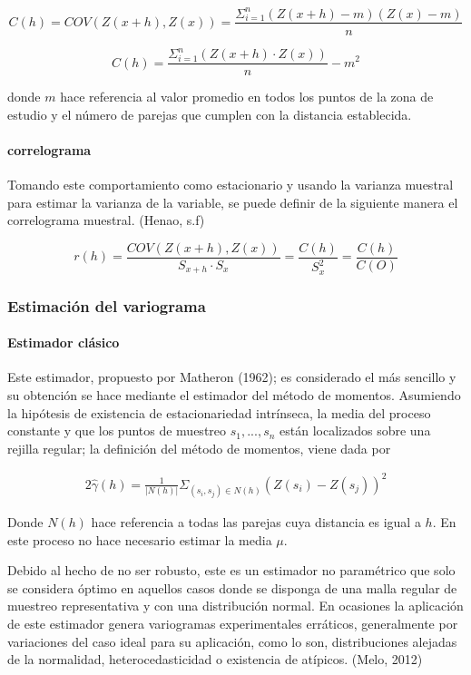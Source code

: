 $$C(h)= COV (Z(x+h), Z(x)) = \frac{\Sigma_{i=1}^n (Z(x+h)-m)(Z(x)-m)}{n} $$

$$ C(h) = \frac{\Sigma_{i=1}^n (Z(x+h) \cdot Z(x))}{n} - m^2$$

 donde $m$ hace referencia al valor promedio en todos los puntos de la zona de estudio y el número de parejas que cumplen con la distancia establecida.
 
 \paragraph{correlograma}
 Tomando este comportamiento como estacionario y usando la varianza muestral para estimar la varianza de la variable, se puede definir de la siguiente
manera el correlograma muestral. (Henao, s.f) \cite{henao_2015}

$$ r(h) = \frac{COV (Z(x+h) , Z(x))}{S_{x+h} \cdot S_x} = \frac{C(h)}{S_x^2} = \frac{C(h)}{C(O)}$$


\subsubsection{Estimación del variograma}

\paragraph{Estimador clásico}
Este estimador, propuesto por Matheron (1962); es considerado el más sencillo y su obtención se hace
mediante el estimador del método de momentos. Asumiendo la hipótesis de existencia de
estacionariedad intrínseca, la media del proceso constante y que los puntos de muestreo ${s_1, ..., s_n}$
están localizados sobre una rejilla regular; la definición del método de momentos, viene dada por

\begin{equation*}
\begin{aligned}
   2\hat{\gamma}(h)  = \frac{1}{|N(h)|}\Sigma_{(s_i, s_j) \in N(h)}  (Z(s_i) - Z(s_j))^2
\end{aligned}
\end{equation*}
 
Donde $N(h)$ hace referencia a todas las parejas cuya distancia es igual a $h$. En este proceso no hace necesario estimar la media $\mu$.

Debido al hecho de no ser robusto, este es un estimador no paramétrico que solo se considera óptimo
en aquellos casos donde se disponga de una malla regular de muestreo representativa y con una
distribución normal. En ocasiones la aplicación de este estimador genera variogramas experimentales
erráticos, generalmente por variaciones del caso ideal para su aplicación, como lo son, distribuciones
alejadas de la normalidad, heterocedasticidad o existencia de atípicos. (Melo, 2012)

